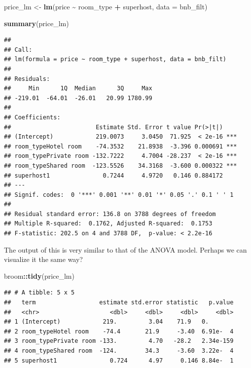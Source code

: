 \documentclass[
]{book}
\newenvironment{Shaded}{\begin{snugshade}}{\end{snugshade}}
\newcommand{\DataTypeTok}[1]{\textcolor[rgb]{0.13,0.29,0.53}{#1}}
\newcommand{\KeywordTok}[1]{\textcolor[rgb]{0.13,0.29,0.53}{\textbf{#1}}}
\newcommand{\NormalTok}[1]{#1}
\newcommand{\OperatorTok}[1]{\textcolor[rgb]{0.81,0.36,0.00}{\textbf{#1}}}
\newcommand{\StringTok}[1]{\textcolor[rgb]{0.31,0.60,0.02}{#1}}
\begin{document}
\begin{Shaded}
\begin{Highlighting}[]
\NormalTok{price\_lm \textless{}{-}}\StringTok{ }\KeywordTok{lm}\NormalTok{(price }\OperatorTok{\textasciitilde{}}\StringTok{ }\NormalTok{room\_type }\OperatorTok{+}\StringTok{ }\NormalTok{superhost, }\DataTypeTok{data =}\NormalTok{ bnb\_filt)}

\KeywordTok{summary}\NormalTok{(price\_lm)}
\end{Highlighting}
\end{Shaded}

\begin{verbatim}
## 
## Call:
## lm(formula = price ~ room_type + superhost, data = bnb_filt)
## 
## Residuals:
##     Min      1Q  Median      3Q     Max 
## -219.01  -64.01  -26.01   20.99 1780.99 
## 
## Coefficients:
##                        Estimate Std. Error t value Pr(>|t|)    
## (Intercept)            219.0073     3.0450  71.925  < 2e-16 ***
## room_typeHotel room    -74.3532    21.8938  -3.396 0.000691 ***
## room_typePrivate room -132.7222     4.7004 -28.237  < 2e-16 ***
## room_typeShared room  -123.5526    34.3168  -3.600 0.000322 ***
## superhost1               0.7244     4.9720   0.146 0.884172    
## ---
## Signif. codes:  0 '***' 0.001 '**' 0.01 '*' 0.05 '.' 0.1 ' ' 1
## 
## Residual standard error: 136.8 on 3788 degrees of freedom
## Multiple R-squared:  0.1762, Adjusted R-squared:  0.1753 
## F-statistic: 202.5 on 4 and 3788 DF,  p-value: < 2.2e-16
\end{verbatim}

The output of this is very similar to that of the ANOVA model. Perhaps we can visualize it the same way?

\begin{Shaded}
\begin{Highlighting}[]
\NormalTok{broom}\OperatorTok{::}\KeywordTok{tidy}\NormalTok{(price\_lm)}
\end{Highlighting}
\end{Shaded}

\begin{verbatim}
## # A tibble: 5 x 5
##   term                  estimate std.error statistic   p.value
##   <chr>                    <dbl>     <dbl>     <dbl>     <dbl>
## 1 (Intercept)            219.         3.04    71.9   0.       
## 2 room_typeHotel room    -74.4       21.9     -3.40  6.91e-  4
## 3 room_typePrivate room -133.         4.70   -28.2   2.34e-159
## 4 room_typeShared room  -124.        34.3     -3.60  3.22e-  4
## 5 superhost1               0.724      4.97     0.146 8.84e-  1
\end{verbatim}
\end{document}
